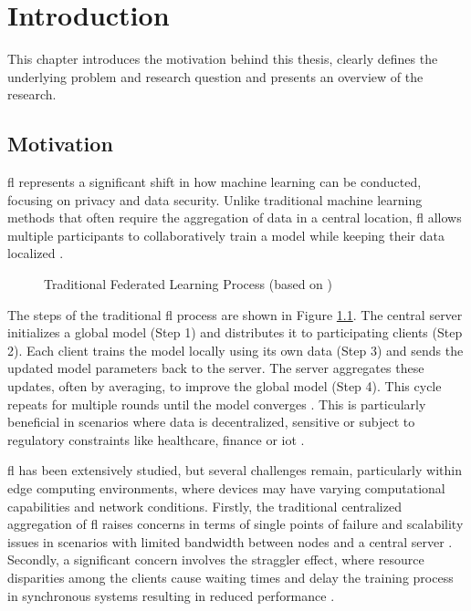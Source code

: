 \chapter{Introduction} \label{cha:introduction}
This chapter introduces the motivation behind this thesis, clearly defines the underlying problem and research question and presents an overview of the research.


\section{Motivation}
\ac{fl} represents a significant shift in how machine learning can be conducted, focusing on privacy and data security. Unlike traditional machine learning methods that often require the aggregation of data in a central location, \ac{fl} allows multiple participants to collaboratively train a model while keeping their data localized \cite{yang_federated_2019} \cite{li_survey_2023} \cite{kairouz_advances_2021}. 
\begin{figure}[htbp]
    \centerline{}
    \caption[Traditional Federated Learning Process]{Traditional Federated Learning Process (based on \cite{jeromemetronome_federated_2019})}
    \label{fig:fl_process}
\end{figure}

\noindent The steps of the traditional \ac{fl} process are shown in Figure \ref{fig:fl_process}. The central server initializes a global model (Step 1) and distributes it to participating clients (Step 2). Each client trains the model locally using its own data (Step 3) and sends the updated model parameters back to the server. The server aggregates these updates, often by averaging, to improve the global model (Step 4). This cycle repeats for multiple rounds until the model converges \cite{zhang_survey_2021}. This is particularly beneficial in scenarios where data is decentralized, sensitive or subject to regulatory constraints like healthcare, finance or \ac{iot} \cite{li_survey_2023} \cite{zhang_survey_2021} \cite{kerkouche_privacy-preserving_2021}.

\ac{fl} has been extensively studied, but several challenges remain, particularly within edge computing environments, where devices may have varying computational capabilities and network conditions. Firstly, the traditional centralized aggregation of \ac{fl} raises concerns in terms of single points of failure and scalability issues in scenarios with limited bandwidth between nodes and a central server \cite{martinez_beltran_decentralized_2023} \cite{ko_asynchronous_2023}. Secondly, a significant concern involves the straggler effect, where resource disparities among the clients cause waiting times and delay the training process in synchronous systems resulting in reduced performance \cite{ko_asynchronous_2023} \cite{vu_straggler_2021}.

